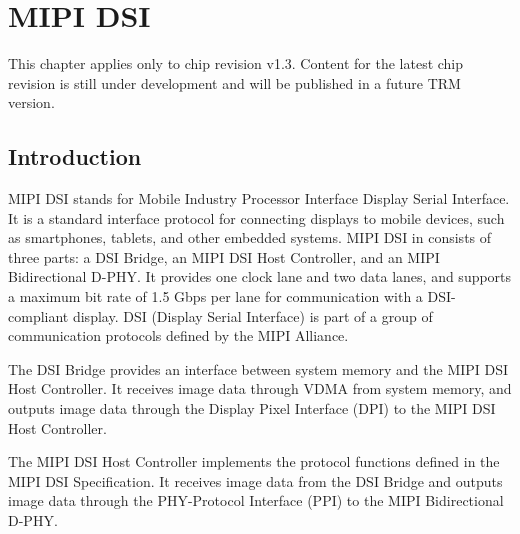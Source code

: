 \documentclass[main\_\_EN.tex]{subfiles}
\begin{document}

\ifglobal
\else
    {\let\clearpage\relax \listoftodos}
    {\let\clearpage\relax \listofdonetodos}
    \tableofcontents
\fi



\hypertarget{mipidsi}{}
\chapter{MIPI DSI}
\label{mod:mipidsi}

\begin{tiplisting}
This chapter applies only to \chipname{} chip revision v1.3. Content for the latest chip revision is still under development and will be published in a future TRM version.
\end{tiplisting}


\section{Introduction}
MIPI DSI stands for Mobile Industry Processor Interface Display Serial Interface. It is a standard interface protocol for connecting displays to mobile devices, such as smartphones, tablets, and other embedded systems. MIPI DSI in \chipseries{} consists of three parts: a DSI Bridge, an MIPI DSI Host Controller, and an MIPI Bidirectional D-PHY. It provides one clock lane and two data lanes, and supports a maximum bit rate of 1.5 Gbps per lane for communication with a DSI-compliant display. DSI (Display Serial Interface) is part of a group of communication protocols defined by the MIPI Alliance.

The DSI Bridge provides an interface between system memory and the MIPI DSI Host Controller. It receives image data through VDMA from system memory, and outputs image data through the Display Pixel Interface (DPI) to the MIPI DSI Host Controller.

The MIPI DSI Host Controller implements the protocol functions defined in the MIPI DSI Specification. It receives image data from the DSI Bridge and outputs image data through the PHY-Protocol Interface (PPI) to the MIPI Bidirectional D-PHY.
\end{document}
